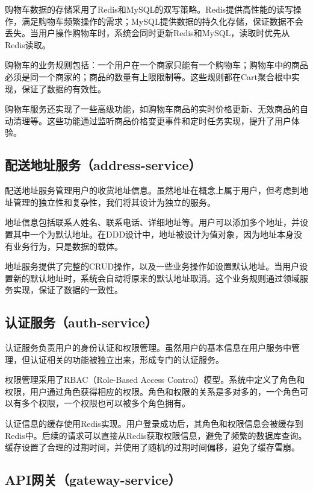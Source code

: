 \documentclass[a4paper,12pt]{article}
\begin{document}
购物车数据的存储采用了Redis和MySQL的双写策略。Redis提供高性能的读写操作，满足购物车频繁操作的需求；MySQL提供数据的持久化存储，保证数据不会丢失。当用户操作购物车时，系统会同时更新Redis和MySQL，读取时优先从Redis读取。

购物车的业务规则包括：一个用户在一个商家只能有一个购物车；购物车中的商品必须是同一个商家的；商品的数量有上限限制等。这些规则都在Cart聚合根中实现，保证了数据的有效性。

购物车服务还实现了一些高级功能，如购物车商品的实时价格更新、无效商品的自动清理等。这些功能通过监听商品价格变更事件和定时任务实现，提升了用户体验。

\subsection{配送地址服务（address-service）}

配送地址服务管理用户的收货地址信息。虽然地址在概念上属于用户，但考虑到地址管理的独立性和复杂性，我们将其设计为独立的服务。

地址信息包括联系人姓名、联系电话、详细地址等。用户可以添加多个地址，并设置其中一个为默认地址。在DDD设计中，地址被设计为值对象，因为地址本身没有业务行为，只是数据的载体。

地址服务提供了完整的CRUD操作，以及一些业务操作如设置默认地址。当用户设置新的默认地址时，系统会自动将原来的默认地址取消。这个业务规则通过领域服务实现，保证了数据的一致性。

\subsection{认证服务（auth-service）}

认证服务负责用户的身份认证和权限管理。虽然用户的基本信息在用户服务中管理，但认证相关的功能被独立出来，形成专门的认证服务。

权限管理采用了RBAC（Role-Based Access Control）模型。系统中定义了角色和权限，用户通过角色获得相应的权限。角色和权限的关系是多对多的，一个角色可以有多个权限，一个权限也可以被多个角色拥有。

认证信息的缓存使用Redis实现。用户登录成功后，其角色和权限信息会被缓存到Redis中。后续的请求可以直接从Redis获取权限信息，避免了频繁的数据库查询。缓存设置了合理的过期时间，并使用了随机的过期时间偏移，避免了缓存雪崩。

\subsection{API网关（gateway-service）}
\end{document}
